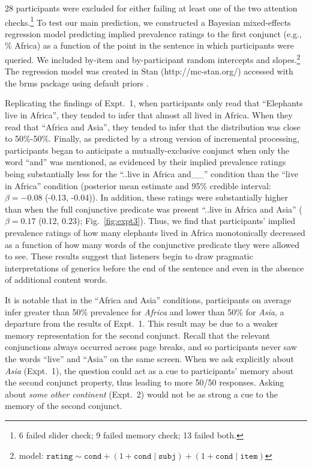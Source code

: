 \documentclass[10pt,letterpaper]{article}
\begin{document}
28 participants were excluded for either failing at least one of the two attention checks.\footnote{
6 failed slider check; 9 failed memory check; 13 failed both.
}
To test our main prediction, we constructed a Bayesian mixed-effects regression model predicting implied prevalence ratings to the first conjunct (e.g., \% Africa) as a function of the point in the sentence in which participants were queried. 
We included by-item and by-participant random intercepts and slopes.\footnote{
model: $\texttt{rating} \sim \texttt{cond} + (1 + \texttt{cond} \mid \texttt{subj}) + (1 + \texttt{cond} \mid \texttt{item})$
}
The regression model was created in Stan (http://mc-stan.org/) accessed with the brms package using default priors \cite{burkner_brms_2017}.


Replicating the findings of Expt.~1, when participants only read that ``Elephants live in Africa'', they tended to infer that almost all lived in Africa. 
When they read that ``Africa and Asia'', they tended to infer that the distribution was close to 50\%-50\%.
Finally, as predicted by a strong version of incremental processing, participants began to anticipate a mutually-exclusive conjunct when only the word ``and'' was mentioned, as evidenced by their implied prevalence ratings being substantially less for the ``..live in Africa and\_\_'' condition than the ``live in Africa'' condition (posterior mean estimate and 95\% credible interval: $\beta = -0.08$ (-0.13, -0.04)).
In addition, these ratings were substantially higher than when the full conjunctive predicate was present ``..live in Africa and Asia'' ($\beta = 0.17$ (0.12, 0.23); Fig.~\ref{fig:expt3}).
Thus, we find that participants' implied prevalence ratings of how many elephants lived in Africa monotonically decreased as a function of how many words of the conjunctive predicate they were allowed to see. 
These results suggest that listeners begin to draw pragmatic interpretations of generics before the end of the sentence and even in the absence of additional content words. 

It is notable that in the ``Africa and Asia'' conditions, participants on average infer greater than 50\% prevalence for \emph{Africa} and lower than 50\% for \emph{Asia}, a departure from the results of Expt.~1.
This result may be due to a weaker memory representation for the second conjunct.
Recall that the relevant conjunctions always occurred across page breaks, and so participants never saw the words ``live'' and ``Asia'' on the same screen.
When we ask explicitly about \emph{Asia} (Expt.~1), the question could act as a cue to participants' memory about the second conjunct property, thus leading to more 50/50 responses.
Asking about \emph{some other continent} (Expt.~2) would not be as strong a cue to the memory of the second conjunct.
\end{document}
